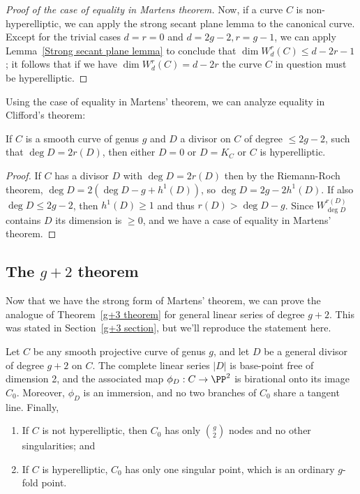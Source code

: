 \begin{proof}[Proof of the case of equality in Martens theorem]
 Now, if a curve $C$ is non-hyperelliptic, we can apply the strong secant plane lemma to the canonical curve. Except for the trivial cases $d=r=0$ and $d=2g-2, r=g-1$,
 we can apply Lemma~\ref{Strong secant plane lemma} to conclude that $\dim W^r_d(C) \leq d-2r-1$; it follows that if we have $\dim W^r_d(C) = d-2r$ the curve $C$ in question must be hyperelliptic.
\end{proof}

Using the case of equality in Martens' theorem, we can analyze equality in 
Clifford's theorem:

\begin{corollary}\label{equality in Clifford from Martens}
If $C$ is a smooth curve of genus $g$ and $D$ a divisor on $C$ of degree $\leq 2g-2$,
such that $\deg D = 2r(D)$, then either $D =0$ or $D=K_C$ or $C$ is hyperelliptic.
\end{corollary}

\begin{proof}
If $C$ has a divisor $D$ with $\deg D =2 r(D)$ then by the Riemann-Roch theorem,  $\deg D  = 2(\deg D-g+h^1(D))$, 
so $\deg D = 2g-2h^1(D)$. If also $\deg D\leq 2g-2$, then $h^1(D) \geq 1$
and thus $r(D) >\deg D-g$. Since $W^{r(D)}_{\deg D}$ contains $D$ its dimension
is $\geq 0$, and we have a case of equality in Martens' theorem.
\end{proof}


\subsection{The $g+2$ theorem}\label{g+2 section}

Now that we have the strong form of Martens' theorem, we can prove the analogue of Theorem~\ref{g+3 theorem} for general linear series of degree $g+2$. This was stated in Section~\ref{g+3 section}, but we'll reproduce the statement here.

\begin{theorem}\label{needed for nodes}
Let $C$ be any smooth projective curve of genus $g$, and let $D$ be a general divisor of degree $g+2$ on $C$. 
The complete linear series $|D|$ is base-point free of dimension 2, and the associated map $\phi_D: C\to \PP^2$
 is birational onto its image $C_0$. Moreover, $\phi_D$ is an immersion, and 
 no two branches of $C_0$ share a tangent line. Finally,

\begin{enumerate}
\item If $C$ is not hyperelliptic, then $C_0$ has only $\binom{g}{2}$ nodes and no other singularities; and
\item If $C$ is hyperelliptic,  $C_0$ has only one singular point, which is an ordinary $g$-fold point.\end{enumerate}
\end{theorem}

